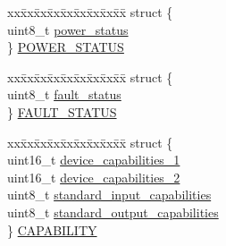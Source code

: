 \begin{DoxyCompactItemize}
\begin{tabbing}
\end{tabbing}\item 
\begin{tabbing}
xx\=xx\=xx\=xx\=xx\=xx\=xx\=xx\=xx\=\kill
struct \{\\
\>uint8\_t \hyperlink{structpd__phy__TCPC__reg__cache__t_a05e820779bb725ef96a3bc1916ac68e9}{power\_status}\\
\} \hyperlink{structpd__phy__TCPC__reg__cache__t_a0b4d0bf01753eda242fefe4c8140707d}{POWER\_STATUS}\\

\end{tabbing}\item 
\begin{tabbing}
xx\=xx\=xx\=xx\=xx\=xx\=xx\=xx\=xx\=\kill
struct \{\\
\>uint8\_t \hyperlink{structpd__phy__TCPC__reg__cache__t_a469e8c7d1d32f308cca7b4c3df5cfc9a}{fault\_status}\\
\} \hyperlink{structpd__phy__TCPC__reg__cache__t_a43ca8f40bc54330696a7ac56030341d7}{FAULT\_STATUS}\\

\end{tabbing}\item 
\begin{tabbing}
xx\=xx\=xx\=xx\=xx\=xx\=xx\=xx\=xx\=\kill
struct \{\\
\>uint16\_t \hyperlink{structpd__phy__TCPC__reg__cache__t_a71389bc5f1470694c3a0d9eb79b9a9f0}{device\_capabilities\_1}\\
\>uint16\_t \hyperlink{structpd__phy__TCPC__reg__cache__t_a9e8caf15d639f3fe85269f9fb5469fdd}{device\_capabilities\_2}\\
\>uint8\_t \hyperlink{structpd__phy__TCPC__reg__cache__t_ae37c13d841a0098a80ff755bea676a65}{standard\_input\_capabilities}\\
\>uint8\_t \hyperlink{structpd__phy__TCPC__reg__cache__t_a8f7a12602d3bac5d12cf259011a9b978}{standard\_output\_capabilities}\\
\} \hyperlink{structpd__phy__TCPC__reg__cache__t_a38027d191f4a9a92f964dc8b75e43b17}{CAPABILITY}\\


\end{tabbing}
\end{DoxyCompactItemize}
